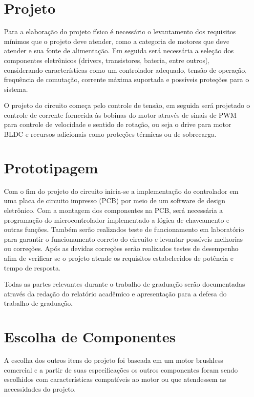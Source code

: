 \documentclass[12pt, a4paper, openright, oneside, brazilian]{abntex2}
\begin{document}
\pagebreak

\section{Projeto}
Para a elaboração do projeto físico é necessário o levantamento dos requisitos mínimos que o projeto deve atender, como a categoria de motores que deve atender e sua fonte de alimentação. Em seguida será necessária a seleção dos componentes eletrônicos (drivers, transistores, bateria, entre outros), considerando características como um controlador adequado, tensão de operação, frequência de comutação, corrente máxima suportada e possíveis proteções para o sistema.

O projeto do circuito começa pelo controle de tensão, em seguida será projetado o controle de corrente fornecida às bobinas do motor através de sinais de PWM para controle de velocidade e sentido de rotação, ou seja o drive para motor BLDC e recursos adicionais como proteções térmicas ou de sobrecarga.

\section{Prototipagem}
Com o fim do projeto do circuito inicia-se a implementação do controlador em uma placa de circuito impresso (PCB) por meio de um software de design eletrônico. Com a montagem dos componentes na PCB, será necessária a programação do microcontrolador implementado a lógica de chaveamento e outras funções. Também serão realizados teste de funcionamento em laboratório para garantir o funcionamento correto do circuito e levantar possíveis melhorias ou correções. Após as devidas correções serão realizados testes de desempenho afim de verificar se o projeto atende os requisitos estabelecidos de potência e tempo de resposta.

Todas as partes relevantes durante o trabalho de graduação serão documentadas através da redação do relatório acadêmico e apresentação para a defesa do trabalho de graduação.

\newpage

\section{Escolha de Componentes}
A escolha dos outros itens do projeto foi baseada em um motor brushless comercial e a partir de suas especificações os outros componentes foram sendo escolhidos com características compatíveis ao motor ou que atendessem as necessidades do projeto.
\end{document}
